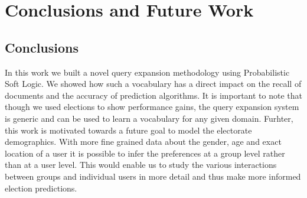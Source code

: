 \chapter{Conclusions and Future Work}
\section{Conclusions}
In this work we built a novel query expansion methodology using Probabilistic Soft Logic.
We showed how such a vocabulary has a direct impact on the recall of documents and the accuracy of prediction algorithms.
It is important to note that though we used elections to show performance gains, the query expansion system is generic and can be used to learn a vocabulary for any given domain.
Furhter, this work is motivated towards a future goal to model the electorate demographics.
With more fine grained data about the gender, age and exact location of a user it is possible to infer the preferences at a group level rather than at a user level.
This would enable us to study the various interactions between groups and individual users in more detail and thus make more informed election predictions.
